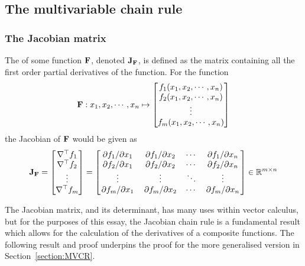 \subsection{The multivariable chain rule}
\subsubsection{The Jacobian matrix}
\begin{defn}
    The  of some function $\mathbf{F}$, denoted $\mathbf{J}_{\mathbf{F}}$, is defined as the matrix containing all the first order partial derivatives
    of the function. For the function
    $$\mathbf{F}:x_1,x_2,\cdots,x_n\mapsto\begin{bmatrix}
        f_1(x_1,x_2,\cdots,x_n)\\
        f_2(x_1,x_2,\cdots,x_n)\\
        \vdots\\
        f_m(x_1,x_2,\cdots,x_n)
    \end{bmatrix}$$
    the Jacobian of $\mathbf{F}$ would be given as
    $$
        \mathbf{J}_{\mathbf{F}}=\begin{bmatrix}
            \nabla^\top f_1\\
            \nabla^\top f_2\\
            \vdots\\
            \nabla^\top f_m
        \end{bmatrix}=\begin{bmatrix}
            \pdv*{f_1}{x_1} & \pdv*{f_1}{x_2} & \cdots & \pdv*{f_1}{x_n}\\
            \pdv*{f_2}{x_1} & \pdv*{f_2}{x_2} & \cdots & \pdv*{f_2}{x_n}\\
            \vdots & \vdots & \ddots & \vdots \\
            \pdv*{f_m}{x_1} & \pdv*{f_m}{x_2} & \cdots & \pdv*{f_m}{x_n}\\
        \end{bmatrix}\in\mathbb{R}^{m\times n}
    $$
\end{defn}
The Jacobian matrix, and its determinant, has many uses within vector calculus, but for the purposes of this essay, the Jacobian chain rule is a fundamental result which allows for the calculation of the derivatives of a composite functions. The following result and proof underpins the proof for the more generalised version in Section~\ref{section:MVCR}.

